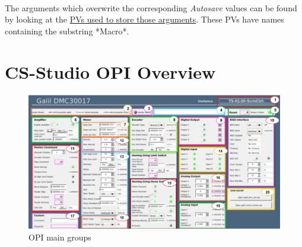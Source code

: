 \documentclass[openany]{article}
\begin{document}
    \paragraph{} The arguments which overwrite the corresponding \emph{Autosave} values can be found by looking at the \hyperlink{pv:mtr-on-macro-cte}{PVs used to store those arguments}. These PVs have names containing the substring *Macro*.

\section{CS-Studio OPI Overview}

    \begin{figure}[!h]
        \caption{OPI main groups}
        \label{fig:opi-main}
        \centering
        \includegraphics[width=1.1\textwidth]{opi_details}
    \end{figure}
    \FloatBarrier
\end{document}
